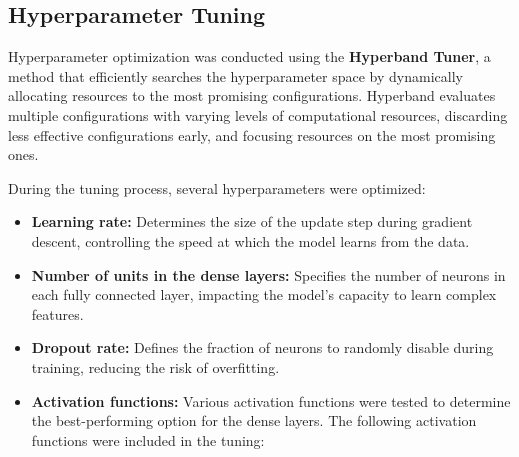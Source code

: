 \subsection{Hyperparameter Tuning}
Hyperparameter optimization was conducted using the \textbf{Hyperband Tuner}, a method that efficiently searches the hyperparameter space by dynamically allocating resources to the most promising configurations. Hyperband evaluates multiple configurations with varying levels of computational resources, discarding less effective configurations early, and focusing resources on the most promising ones.

During the tuning process, several hyperparameters were optimized:
\begin{itemize}
    \item \textbf{Learning rate:} Determines the size of the update step during gradient descent, controlling the speed at which the model learns from the data.
    \item \textbf{Number of units in the dense layers:} Specifies the number of neurons in each fully connected layer, impacting the model's capacity to learn complex features.
    \item \textbf{Dropout rate:} Defines the fraction of neurons to randomly disable during training, reducing the risk of overfitting.
    \item \textbf{Activation functions:} Various activation functions were tested to determine the best-performing option for the dense layers. The following activation functions were included in the tuning:
\end{itemize}


